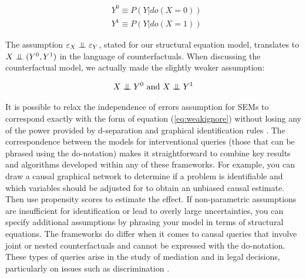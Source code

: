 \documentclass[11pt,a4paper,oneside]{book}
\theoremstyle{plain}
\theoremstyle{definition}
\let\epsilon\varepsilon
\newcommand{\ci}{\mathrel{\perp\mspace{-10mu}\perp}}
\begin{document}
\begin{equation}
\begin{aligned}
&Y^{0} \equiv P(Y|do(X=0)) \\
&Y^{1} \equiv P(Y|do(X=1))
\end{aligned}
\end{equation}

The assumption $\epsilon_{X} \ci \epsilon_{Y}$, stated for our structural equation model, translates to $X \ci (Y^{0},Y^{1})$ in the language of counterfactuals. When discussing the counterfactual model, we actually made the slightly weaker assumption:

\begin{equation}
\label{eq:weakignore}
X \ci Y^{0} \text{ and } X \ci Y^{1}
\end{equation}

It is possible to relax the independence of errors assumption for SEMs to correspond exactly with the form of equation (\ref{eq:weakignore}) without losing any of the power provided by d-separation and graphical identification rules \citep{Richardson2013}. The correspondence between the models for interventional queries (those that can be phrased using the do-notation) makes it straightforward to combine key results and algorithms developed within any of these frameworks. For example, you can draw a causal graphical network to determine if a problem is identifiable and which variables should be adjusted for to obtain an unbiased causal estimate. Then use propensity scores \citep{Rosenbaum1983} to estimate the effect. If non-parametric assumptions are insufficient for identification or lead to overly large uncertainties, you can specify additional assumptions by phrasing your model in terms of structural equations. The frameworks do differ when it comes to causal queries that involve joint or nested counterfactuals and cannot be expressed with the do-notation. These types of queries arise in the study of mediation \citep{Pearl2014,Imai2010a,VanderWeele2011} and in legal decisions, particularly on issues such as discrimination \citep{Pearl2000}. 
\end{document}
